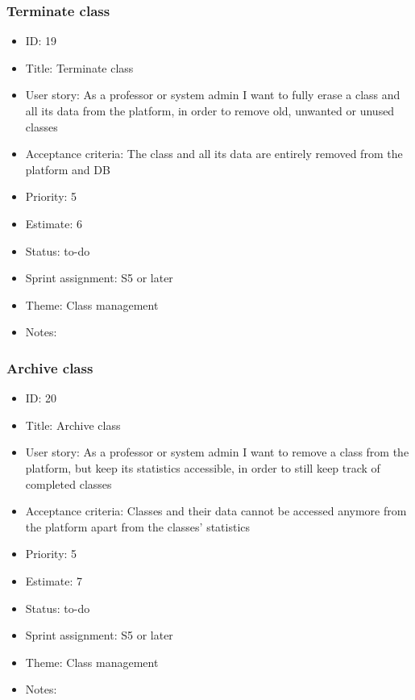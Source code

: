 \subsubsection{Terminate class}
\begin{itemize}
	\item ID: 19
	\item Title: Terminate class
	\item User story: As a professor or system admin I want to fully erase a class and all its data from the platform, in order to remove old, unwanted or unused classes
	\item Acceptance criteria: The class and all its data are entirely removed from the platform and DB
	\item Priority: 5
	\item Estimate: 6
	\item Status: to-do
	\item Sprint assignment: S5 or later
	\item Theme: Class management
	\item Notes:
\end{itemize}

\subsubsection{Archive class}
\begin{itemize}
	\item ID: 20
	\item Title: Archive class
	\item User story: As a professor or system admin I want to remove a class from the platform, but keep its statistics accessible, in order to still keep track of completed classes
	\item Acceptance criteria: Classes and their data cannot be accessed anymore from the platform apart from the classes' statistics
	\item Priority: 5
	\item Estimate: 7
	\item Status: to-do
	\item Sprint assignment: S5 or later
	\item Theme: Class management
	\item Notes:
\end{itemize}

